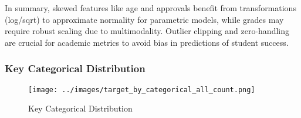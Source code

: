 \documentclass[twoside,final]{hcmut-report}
\begin{document}
In summary, skewed features like age and approvals benefit from transformations (log/sqrt) to approximate normality for parametric models, while grades may require robust scaling due to multimodality. Outlier clipping and zero-handling are crucial for academic metrics to avoid bias in predictions of student success.

\subsubsection{Key Categorical Distribution}

\begin{figure}[H]
  \centering
  \texttt{[image: ../images/target\_by\_categorical\_all\_count.png]}
  \caption{Key Categorical Distribution}
  \label{cat_dist_dist}
\end{figure}
\end{document}
